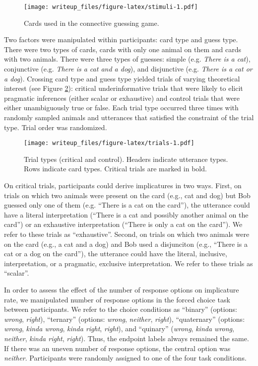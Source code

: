 \documentclass[man]{apa6}
\theoremstyle{definition}
\theoremstyle{definition}
\theoremstyle{definition}
\theoremstyle{remark}
\begin{document}
\begin{figure}
\centering
\texttt{[image: writeup\_files/figure-latex/stimuli-1.pdf]}
\caption{\label{fig:stimuli}Cards used in the connective guessing game.}
\end{figure}

Two factors were manipulated within participants: card type and guess
type. There were two types of cards, cards with only one animal on them
and cards with two animals. There were three types of guesses: simple
(e.g. \emph{There is a cat}), conjunctive (e.g. \emph{There is a cat and
a dog}), and disjunctive (e.g. \emph{There is a cat or a dog}). Crossing
card type and guess type yielded trials of varying theoretical interest
(see Figure \ref{fig:trials}): critical underinformative trials that
were likely to elicit pragmatic inferences (either scalar or exhaustive)
and control trials that were either unambiguously true or false. Each
trial type occurred three times with randomly sampled animals and
utterances that satisfied the constraint of the trial type. Trial order
was randomized.

\begin{figure}
\centering
\texttt{[image: writeup\_files/figure-latex/trials-1.pdf]}
\caption{\label{fig:trials}Trial types (critical and control). Headers
indicate utterance types. Rows indicate card types. Critical trials are
marked in bold.}
\end{figure}

On critical trials, participants could derive implicatures in two ways.
First, on trials on which two animals were present on the card (e.g.,
cat and dog) but Bob guessed only one of them (e.g. \enquote{There is a
cat on the card}), the utterance could have a literal interpretation
(\enquote{There is a cat and possibly another animal on the card}) or an
exhaustive interpretation (\enquote{There is only a cat on the card}).
We refer to these trials as \enquote{exhaustive}. Second, on trials on
which two animals were on the card (e.g., a cat and a dog) and Bob used
a disjunciton (e.g., \enquote{There is a cat or a dog on the card}), the
utterance could have the literal, inclusive, interpretation, or a
pragmatic, exclusive interpretation. We refer to these trials as
\enquote{scalar}.

In order to assess the effect of the number of response options on
implicature rate, we manipulated number of response options in the
forced choice task between participants. We refer to the choice
conditions as \enquote{binary} (options: \emph{wrong}, \emph{right}),
\enquote{ternary} (options: \emph{wrong}, \emph{neither}, \emph{right}),
\enquote{quaternary} (options: \emph{wrong}, \emph{kinda wrong},
\emph{kinda right}, \emph{right}), and \enquote{quinary} (\emph{wrong},
\emph{kinda wrong}, \emph{neither}, \emph{kinda right}, \emph{right}).
Thus, the endpoint labels always remained the same. If there was an
uneven number of response options, the central option was
\emph{neither}. Participants were randomly assigned to one of the four
task conditions.
\end{document}
